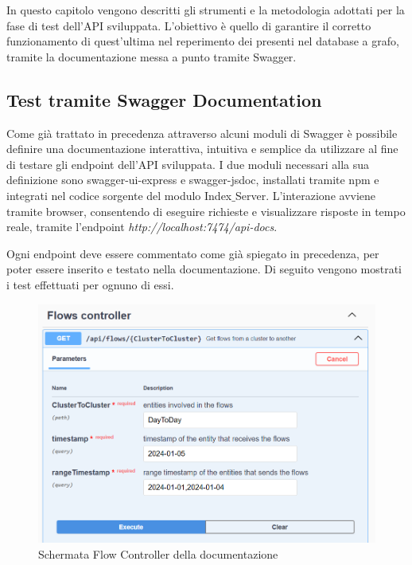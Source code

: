 In questo capitolo vengono descritti gli strumenti e la metodologia adottati per la fase di test dell'API sviluppata. L'obiettivo è quello di garantire il corretto funzionamento di quest'ultima nel reperimento dei presenti nel database a grafo, tramite la documentazione messa a punto tramite Swagger.



\subsection{Test tramite Swagger Documentation}
Come già trattato in precedenza attraverso alcuni moduli di Swagger è possibile definire una documentazione interattiva, intuitiva e semplice da utilizzare al fine di testare gli endpoint dell'API sviluppata.
I due moduli necessari alla sua definizione sono swagger-ui-express e swagger-jsdoc, installati tramite npm e integrati nel codice sorgente del modulo Index$\_$Server.
L'interazione avviene tramite browser, consentendo di eseguire richieste e visualizzare risposte in tempo reale, tramite l'endpoint \emph{http://localhost:7474/api-docs}.

Ogni endpoint deve essere commentato come già spiegato in precedenza, per poter essere inserito e testato nella documentazione. Di seguito vengono mostrati i test effettuati per ognuno di essi.


\begin{figure}[H]
    \centering \includegraphics[keepaspectratio=true,scale=0.5]{Images/FlowControllerTestSwagger.png}
    \caption{Schermata Flow Controller della documentazione}
\end{figure}

